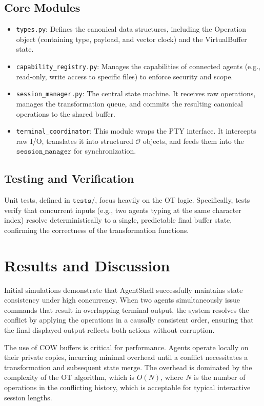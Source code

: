\documentclass[11pt,a4paper]{article}
\begin{document}
\subsection{Core Modules}
\begin{itemize}
    \item \texttt{types.py}: Defines the canonical data structures, including the Operation object (containing type, payload, and vector clock) and the VirtualBuffer state.
    \item \texttt{capability\_registry.py}: Manages the capabilities of connected agents (e.g., read-only, write access to specific files) to enforce security and scope.
    \item \texttt{session\_manager.py}: The central state machine. It receives raw operations, manages the transformation queue, and commits the resulting canonical operations to the shared buffer.
    \item \texttt{terminal\_coordinator}: This module wraps the PTY interface. It intercepts raw I/O, translates it into structured $\mathcal{O}$ objects, and feeds them into the $\texttt{session\_manager}$ for synchronization.
\end{itemize}

\subsection{Testing and Verification}
Unit tests, defined in $\texttt{tests/}$, focus heavily on the OT logic. Specifically, tests verify that concurrent inputs (e.g., two agents typing at the same character index) resolve deterministically to a single, predictable final buffer state, confirming the correctness of the transformation functions.

\section{Results and Discussion}
Initial simulations demonstrate that AgentShell successfully maintains state consistency under high concurrency. When two agents simultaneously issue commands that result in overlapping terminal output, the system resolves the conflict by applying the operations in a causally consistent order, ensuring that the final displayed output reflects both actions without corruption.

The use of COW buffers is critical for performance. Agents operate locally on their private copies, incurring minimal overhead until a conflict necessitates a transformation and subsequent state merge. The overhead is dominated by the complexity of the OT algorithm, which is $O(N)$, where $N$ is the number of operations in the conflicting history, which is acceptable for typical interactive session lengths.
\end{document}
